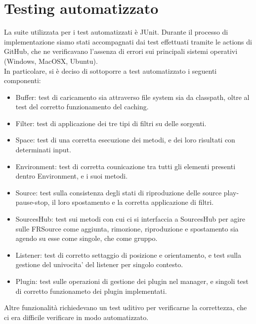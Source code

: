 \documentclass[a4paper,12pt]{report}
\begin{document}
\section{Testing automatizzato}
La suite utilizzata per i test automatizzati è JUnit. Durante il processo di implementazione siamo stati accompagnati dai test effettuati tramite le actions di GitHub, che ne verificavano l'assenza di errori sui principali sistemi operativi (Windows, MacOSX, Ubuntu).
\\In particolare, si è deciso di sottoporre a test automatizzato i seguenti componenti:
\begin{itemize}
	\item Buffer: test di caricamento sia attraverso file system sia da classpath, oltre al test del corretto funzionamento del caching.
	\item Filter: test di applicazione dei tre tipi di filtri su delle sorgenti.
	\item Space: test di una corretta esecuzione dei metodi, e dei loro risultati con determinati input.
	\item Environment: test di corretta counicazione tra tutti gli elementi presenti dentro Environment, e i suoi metodi.
	\item Source: test sulla consistenza degli stati di riproduzione delle source play-pause-stop, il loro spostamento e la corretta applicazione di filtri.
	\item SourcesHub: test sui metodi con cui ci si interfaccia a SourcesHub per agire sulle FRSource come aggiunta, rimozione, riproduzione e spostamento sia agendo su esse come singole, che come gruppo.
	\item Listener: test di corretto settaggio di posizione e orientamento, e test sulla gestione del univocita' del listener per singolo contesto.
	\item Plugin: test sulle operazioni di gestione dei plugin nel manager, e singoli test di corretto funzionameto dei plugin implementati.
\end{itemize}
Altre funzionalità richiedevano un test uditivo per verificarne la correttezza, che ci era difficile verificare in modo automatizzato.
%
\end{document}
